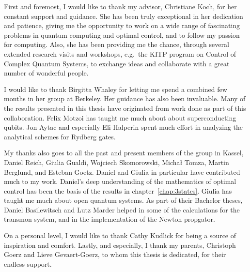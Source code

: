 
First and foremost, I would like to thank my advisor, Christiane Koch, for her
constant support and guidance. She has been truly exceptional in her dedication
and patience, giving me the opportunity to work on a wide range of fascinating
problems in quantum computing and optimal control, and to follow my passion for
computing. Also, she has been providing me the chance, through
several extended research visits and workshops, e.g.\ the KITP program on
Control of Complex Quantum Systems, to exchange ideas and collaborate
with a great number of wonderful people.

I would like to thank Birgitta Whaley for letting me spend a combined
few months in her group at Berkeley. Her guidance has also been
invaluable. Many of the results presented in
this thesis have originated from work done as part of this collaboration.
Felix Motzoi has taught me much about about superconducting qubits.
Jon Aytac and especially Eli Halperin spent much effort in analyzing the
analytical schemes for Rydberg gates.

My thanks also goes to all the past and present members of the group in Kassel,
Daniel Reich, Giulia Gualdi, Wojciech Skomorowski, Michał Tomza, Martin
Berglund, and Esteban Goetz. Daniel and Giulia in particular have contributed
much to my work. Daniel's deep understanding of the mathematics of optimal
control has been the basis of the results in chapter~\ref{chap:3states}.
Giulia has taught me much about open quantum systems.
As part of their Bachelor theses, Daniel Basilewitsch and Lutz Marder helped in
some of the calculations for the transmon system, and in the implementation of
the Newton propgator.

On a personal level, I would like to thank Cathy Kudlick for being a source of
inspiration and comfort. Lastly, and especially, I thank my parents, Christoph
Goerz and Lieve Gevaert-Goerz, to whom this thesis is dedicated, for their
endless support.

